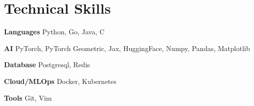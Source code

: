 
\section{Technical Skills}\vspace{-1.0em}
\begin{multicols}{2}
	\begin{compactitem}
		\item \textbf{Languages} Python, Go, Java, C 
		\item \textbf{AI} PyTorch, PyTorch Geometric, Jax, HuggingFace, Numpy, Pandas, Matplotlib 
		\item \textbf{Database} Postgresql, Redis
		
		\item \textbf{Cloud/MLOps} Docker, Kubernetes 
		\item \textbf{Tools} Git, Vim
	\end{compactitem}
\end{multicols}